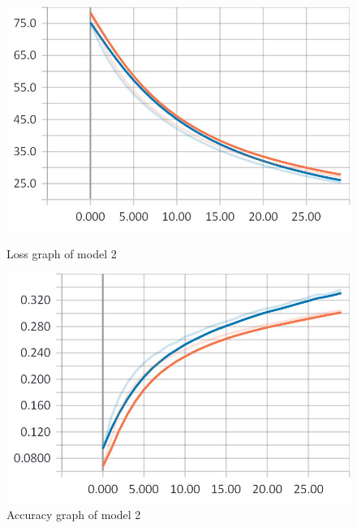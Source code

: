\begin{figure}
\centering
\begin{minipage}{.5\textwidth}
	\centering
	\includegraphics[width=1\linewidth]{Illustrations/losss3.jpg}
	\caption{Loss graph of model 2}
	\label{fig:loss3}
\end{minipage}%
\begin{minipage}{.5\textwidth}
	\centering
	\includegraphics[width=1\linewidth]{Illustrations/accuracy3.jpg}
	\caption{Accuracy graph of model 2}
	\label{fig:accuracy3}
\end{minipage}
\end{figure}

